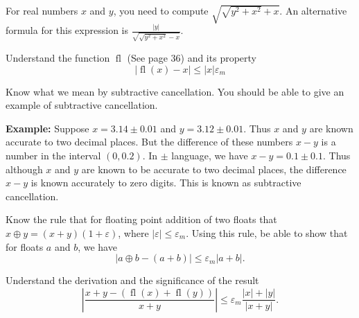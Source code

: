 \documentclass[12pt,fleqn]{exam}
\DeclareMathOperator{\fl}{fl}
\begin{document}
\begin{questions}
\question For real numbers \(x\) and \(y\), you need to compute
\(
     \sqrt{\sqrt{{{y}^{2}}+{{x}^{2}}}+x}.
    \)
An alternative formula for this expression is
\(\frac{\left| y\right| }{\sqrt{\sqrt{{{y}^{2}}+{{x}^{2}}}-x}}\).  



\question Understand the function \(\fl\) (See page 36) and its property 
\[
    \left | \fl(x) - x \right|  \leq |x| \varepsilon_m
\] 

\item  Know what we mean by subtractive cancellation.  You should be able to give an example of subtractive cancellation. 

\textbf{Example:}  Suppose \(x = 3.14 \pm 0.01\) and \(y = 3.12 \pm 0.01\).  Thus \(x\) and \(y\) are known accurate to two decimal places. But the difference of these numbers \(x - y\) is a number in the interval \((0, 0.2)\). In \(\pm\) language,
we have \(x - y = 0.1 \pm 0.1\).  Thus although \(x\) and \(y\) are known to be accurate to two decimal places,  the difference \(x - y\) is known accurately to zero digits. This is known as subtractive cancellation.




\question Know the rule that for floating point addition of two floats that \(x  \oplus y = (x + y) (1 + \varepsilon) \), where \(|\varepsilon| \leq \varepsilon_m\).  Using this rule, be able to show that for floats \(a\) and \(b\), we have
\[
     \left|  a  \oplus b - (a + b)   \right|  \leq \varepsilon_m   \left |a + b \right| .
 \]


\question Understand the derivation and the significance of the result
\[
   \left | \frac{x + y -  (\fl(x) + \fl(y))}{x + y}  \right|  \leq \varepsilon_m \frac{|x| + |y|}{|x + y|}.
\]






\end{questions}
\end{document}

